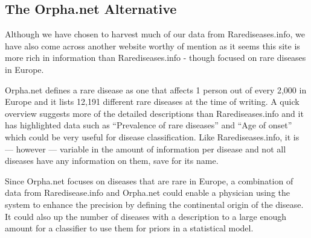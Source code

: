 \subsection{The Orpha.net Alternative\label{Orphanet}}

Although we have chosen to harvest much of our data from
Rarediseases.info, we have also come across another website worthy of
mention as it seems this site is more rich in information than
Rarediseases.info - though focused on rare diseases in Europe.

Orpha.net defines a rare disease as one that affects 1 person out of 
every 2,000 in Europe and it lists 12,191 different rare diseases at 
the time of writing. A quick overview suggests more of the detailed 
descriptions than Rarediseases.info and it has highlighted data such 
as ``Prevalence of rare diseases'' and ``Age of onset'' which could be very 
useful for disease classification. Like Rarediseases.info, it is 
--- however --- variable in the amount of information per disease and 
not all diseases have any information on them, save for its name.

Since Orpha.net focuses on diseases that are rare in Europe, a combination 
of data from Raredisease.info and Orpha.net could enable a physician using 
the system to enhance the precision by defining the continental origin of 
the disease. It could also up the number of diseases with a description to 
a large enough amount for a classifier to use them for priors in a 
statistical model. 

